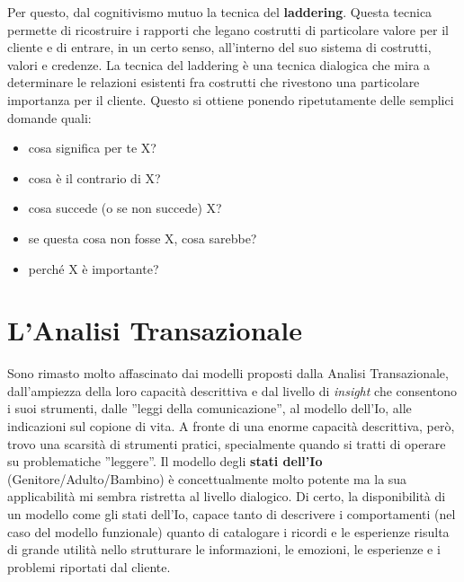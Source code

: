 Per questo, dal cognitivismo mutuo la tecnica del \textbf{laddering}\label{laddering}. Questa tecnica permette di ricostruire i rapporti che legano costrutti di particolare valore per il cliente e di entrare, in un certo senso, all'interno del suo sistema di costrutti, valori e credenze. La tecnica del laddering è una tecnica dialogica che mira a determinare le relazioni esistenti fra costrutti che rivestono una particolare importanza per il cliente. Questo si ottiene ponendo ripetutamente delle semplici domande quali:
\begin{itemize}
\item cosa significa per te X?
\item cosa è il contrario di X?
\item cosa succede (o se non succede) X?
\item se questa cosa non fosse X, cosa sarebbe?
\item perché X è importante?
\end{itemize}


\section{L'Analisi Transazionale}
\label{sec:at}
Sono rimasto molto affascinato dai modelli proposti dalla Analisi Transazionale\cite{AT}, dall'ampiezza della loro capacità descrittiva e dal livello di \emph{insight} che consentono i suoi strumenti, dalle ''leggi della comunicazione'', al modello dell'Io, alle indicazioni sul copione di vita.
A fronte di una enorme capacità descrittiva, però, trovo una scarsità di strumenti pratici, specialmente quando si tratti di operare su problematiche ''leggere''.
Il modello degli \textbf{stati dell'Io} (Genitore/Adulto/Bambino)%
 è concettualmente molto potente ma la sua applicabilità mi sembra ristretta al livello dialogico. Di certo, la disponibilità di un modello come gli stati dell'Io, capace tanto di descrivere i comportamenti (nel caso del modello funzionale) quanto di catalogare i ricordi e le esperienze risulta di grande utilità nello strutturare le informazioni, le emozioni, le esperienze e i problemi riportati dal cliente.

